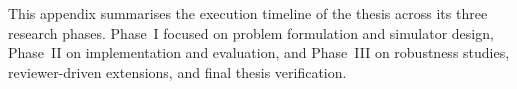 
\label{app:gantt}

This appendix summarises the execution timeline of the thesis across
its three research phases. Phase~I focused on problem formulation and
simulator design, Phase~II on implementation and evaluation, and
Phase~III on robustness studies, reviewer-driven extensions, and final
thesis verification.

